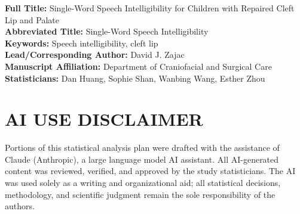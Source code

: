 \documentclass{article}
\begin{document}
\noindent\textbf{Full Title:} Single-Word Speech Intelligibility for Children with Repaired Cleft Lip and Palate\\
\textbf{Abbreviated Title:} Single-Word Speech Intelligibility  \\
\textbf{Keywords:} Speech intelligibility, cleft lip  \\
\textbf{Lead/Corresponding Author:} David J. Zajac \\
\textbf{Manuscript Affiliation:} Department of Craniofacial and Surgical Care \\
\textbf{Statisticians:} Dan Huang, Sophie Shan, Wanbing Wang, Esther Zhou \\

\vspace{1em}

\section*{AI USE DISCLAIMER}\label{sec:ai}
Portions of this statistical analysis plan were drafted with the assistance 
of Claude (Anthropic), a large language model AI assistant. All AI-generated 
content was reviewed, verified, and approved by the study statisticians. The 
AI was used solely as a writing and organizational aid; all statistical 
decisions, methodology, and scientific judgment remain the sole responsibility 
of the authors.

\end{document}
